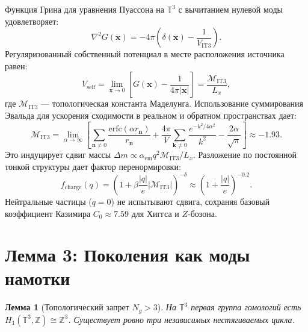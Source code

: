 \documentclass[12pt,a4paper]{article}
\newtheorem{lemma}{Лемма}
\begin{document}
Функция Грина для уравнения Пуассона на $\mathbb{T}^3$ с вычитанием нулевой моды удовлетворяет:
\begin{equation}
    \nabla^2 G(\mathbf{x}) = -4\pi \left( \delta(\mathbf{x}) - \frac{1}{V_{\text{IT3}}} \right).
\end{equation}
Регуляризованный собственный потенциал в месте расположения источника равен:
\begin{equation}
    V_{\text{self}} = \lim_{\mathbf{x}\to 0} \left[ G(\mathbf{x}) - \frac{1}{4\pi|\mathbf{x}|} \right] = \frac{\mathcal{M}_{\text{IT3}}}{L_x},
\end{equation}
где $\mathcal{M}_{\text{IT3}}$ — топологическая константа Маделунга. Использование суммирования Эвальда для ускорения сходимости в реальном и обратном пространствах дает:
\begin{equation}
    \mathcal{M}_{\text{IT3}} = \lim_{\alpha\to\infty} \left[ \sum_{\mathbf{n}\neq 0} \frac{\text{erfc}(\alpha r_{\mathbf{n}})}{r_{\mathbf{n}}} + \frac{4\pi}{V} \sum_{\mathbf{k}\neq 0} \frac{e^{-k^2/4\alpha^2}}{k^2} - \frac{2\alpha}{\sqrt{\pi}} \right] \approx -1.93.
\end{equation}
Это индуцирует сдвиг массы $\Delta m \propto \alpha_{\text{em}} q^2 \mathcal{M}_{\text{IT3}}/L_x$. Разложение по постоянной тонкой структуры дает фактор перенормировки:
\begin{equation}
    f_{\text{charge}}(q) = \left( 1 + \beta \frac{|q|}{e} |\mathcal{M}_{\text{IT3}}| \right)^{-\delta} \approx \left( 1 + \frac{|q|}{e} \right)^{-0.2}.
\end{equation}
Нейтральные частицы ($q=0$) не испытывают сдвига, сохраняя базовый коэффициент Казимира $C_0 \approx 7.59$ для Хиггса и $Z$-бозона.

\section{Лемма 3: Поколения как моды намотки}
\begin{lemma}[Топологический запрет $N_g > 3$]
На $\mathbb{T}^3$ первая группа гомологий есть $H_1(\mathbb{T}^3,\mathbb{Z}) \cong \mathbb{Z}^3$. Существует ровно три независимых нестягиваемых цикла.
\end{lemma}
\end{document}
